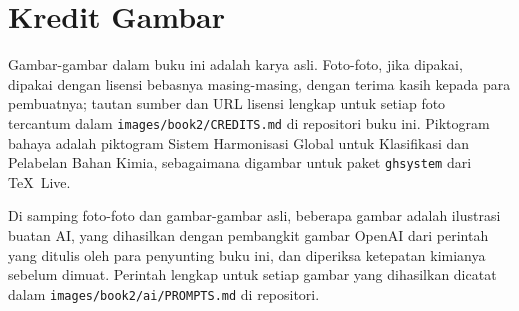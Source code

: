 \chapter*{Kredit Gambar}

Gambar-gambar dalam buku ini adalah karya asli. Foto-foto, jika dipakai,
dipakai dengan lisensi bebasnya masing-masing, dengan terima kasih kepada
para pembuatnya; tautan sumber dan URL lisensi lengkap untuk setiap foto
tercantum dalam \texttt{images/book2/CREDITS.md} di repositori buku ini.
Piktogram bahaya adalah piktogram Sistem Harmonisasi Global untuk
Klasifikasi dan Pelabelan Bahan Kimia, sebagaimana digambar untuk paket
\texttt{ghsystem} dari \TeX\ Live.

\bigskip
Di samping foto-foto dan gambar-gambar asli, beberapa gambar adalah
ilustrasi buatan AI, yang dihasilkan dengan pembangkit gambar OpenAI dari
perintah yang ditulis oleh para penyunting buku ini, dan diperiksa
ketepatan kimianya sebelum dimuat. Perintah lengkap untuk setiap gambar
yang dihasilkan dicatat dalam \texttt{images/book2/ai/PROMPTS.md} di
repositori.

